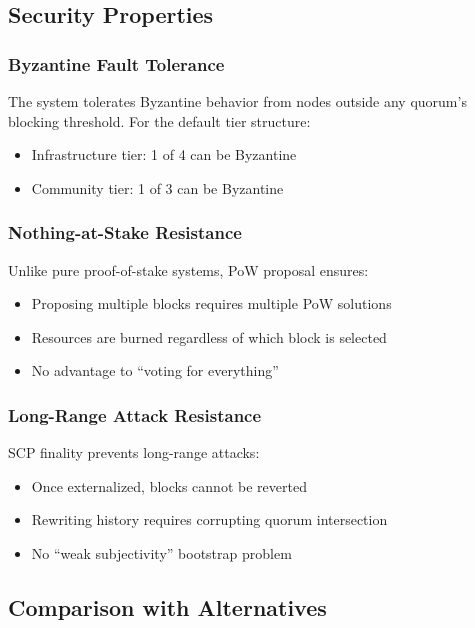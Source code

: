 \subsection{Security Properties}

\subsubsection{Byzantine Fault Tolerance}

The system tolerates Byzantine behavior from nodes outside any quorum's
blocking threshold. For the default tier structure:
\begin{itemize}
  \item Infrastructure tier: 1 of 4 can be Byzantine
  \item Community tier: 1 of 3 can be Byzantine
\end{itemize}

\subsubsection{Nothing-at-Stake Resistance}

Unlike pure proof-of-stake systems, PoW proposal ensures:
\begin{itemize}
  \item Proposing multiple blocks requires multiple PoW solutions
  \item Resources are burned regardless of which block is selected
  \item No advantage to ``voting for everything''
\end{itemize}

\subsubsection{Long-Range Attack Resistance}

SCP finality prevents long-range attacks:
\begin{itemize}
  \item Once externalized, blocks cannot be reverted
  \item Rewriting history requires corrupting quorum intersection
  \item No ``weak subjectivity'' bootstrap problem
\end{itemize}

\subsection{Comparison with Alternatives}

